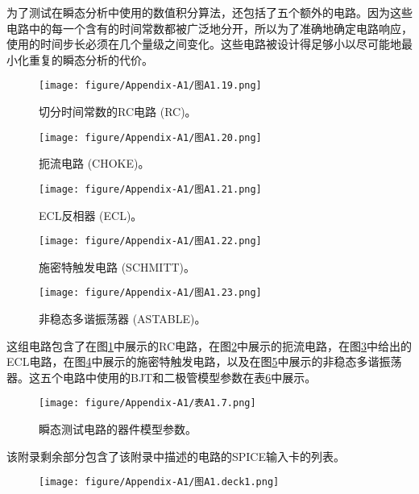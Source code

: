 为了测试在瞬态分析中使用的数值积分算法，还包括了五个额外的电路。因为这些电路中的每一个含有的时间常数都被广泛地分开，所以为了准确地确定电路响应，使用的时间步长必须在几个量级之间变化。这些电路被设计得足够小以尽可能地最小化重复的瞬态分析的代价。

\begin{figure}[htbp]
\small
    \centering
    \texttt{[image: figure/Appendix-A1/图A1.19.png]}
    \caption{切分时间常数的RC电路 (RC)。}
    \label{图A1.19}
\end{figure}

\begin{figure}[htbp]
\small
    \centering
    \texttt{[image: figure/Appendix-A1/图A1.20.png]}
    \caption{扼流电路 (CHOKE)。}
    \label{图A1.20}
\end{figure}

\begin{figure}[htbp]
\small
    \centering
    \texttt{[image: figure/Appendix-A1/图A1.21.png]}
    \caption{ECL反相器 (ECL)。}
    \label{图A1.21}
\end{figure}

\begin{figure}[htbp]
\small
    \centering
    \texttt{[image: figure/Appendix-A1/图A1.22.png]}
    \caption{施密特触发电路 (SCHMITT)。}
    \label{图A1.22}
\end{figure}

\begin{figure}[htbp]
\small
    \centering
    \texttt{[image: figure/Appendix-A1/图A1.23.png]}
    \caption{非稳态多谐振荡器 (ASTABLE)。}
    \label{图A1.23}
\end{figure}

这组电路包含了在图\ref{图A1.19}中展示的RC电路，在图\ref{图A1.20}中展示的扼流电路，在图\ref{图A1.21}中给出的ECL电路，在图\ref{图A1.22}中展示的施密特触发电路，以及在图\ref{图A1.23}中展示的非稳态多谐振荡器。这五个电路中使用的BJT和二极管模型参数在表\ref{表A1.7}中展示。

\begin{figure}[htbp]
\small
    \centering
    \texttt{[image: figure/Appendix-A1/表A1.7.png]}
    \caption{瞬态测试电路的器件模型参数。}
    \label{表A1.7}
\end{figure}

该附录剩余部分包含了该附录中描述的电路的SPICE输入卡的列表。
\begin{figure}[htbp]
\small
    \centering
    \texttt{[image: figure/Appendix-A1/图A1.deck1.png]}
    \caption{}
    \label{图A1.deck1}
\end{figure}

